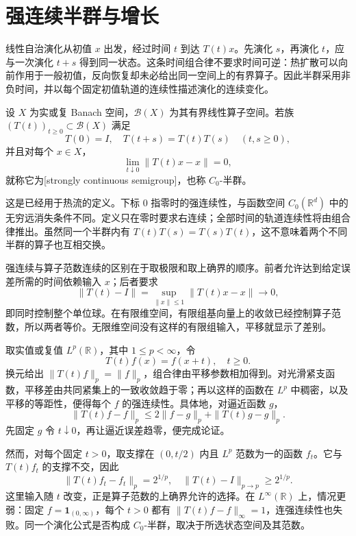 \section{强连续半群与增长}
\label{b2:sec:app-D-1}

线性自治演化从初值 \(x\) 出发，经过时间 \(t\) 到达 \(T(t)x\)。先演化 \(s\)，再演化 \(t\)，应与一次演化 \(t+s\) 得到同一状态。这条时间组合律不要求时间可逆：热扩散可以向前作用于一般初值，反向恢复却未必给出同一空间上的有界算子。因此半群采用非负时间，并以每个固定初值轨道的连续性描述演化的连续变化。

\begin{definition}\label{b2:def:D-semigroup}
设 \(X\) 为实或复 Banach 空间，\(\mathcal B(X)\) 为其有界线性算子空间。若族 \((T(t))_{t\geq0}\subset\mathcal B(X)\) 满足
\[
 T(0)=I,\quad T(t+s)=T(t)T(s)\quad(t,s\geq0),
\]
并且对每个 \(x\in X\)，
\[
 \lim_{t\downarrow0}\|T(t)x-x\|=0,
\]
就称它为[strongly continuous semigroup]，也称 \(C_0\)-半群。
\end{definition}
这是已经用于热流的定义。下标 \(0\) 指零时的强连续性，与函数空间 \(C_0(\mathbb R^d)\) 中的无穷远消失条件不同。定义只在零时要求右连续；全部时间的轨道连续性将由组合律推出。虽然同一个半群内有 \(T(t)T(s)=T(s)T(t)\)，这不意味着两个不同半群的算子也互相交换。

\ProseParagraphBreak

强连续与算子范数连续的区别在于取极限和取上确界的顺序。前者允许达到给定误差所需的时间依赖输入 \(x\)；后者要求
\[
 \|T(t)-I\|=\sup_{\|x\|\leq1}\|T(t)x-x\|\longrightarrow0,
\]
即同时控制整个单位球。在有限维空间，有限组基向量上的收敛已经控制算子范数，所以两者等价。无限维空间没有这样的有限组输入，平移就显示了差别。

\ProseParagraphBreak

取实值或复值 \(L^p(\mathbb R)\)，其中 \(1\leq p<\infty\)，令
\[
 T(t)f(x)=f(x+t),\quad t\geq0.
\]
换元给出 \(\|T(t)f\|_p=\|f\|_p\)，组合律由平移参数相加得到。对光滑紧支函数，平移差由共同紧集上的一致收敛趋于零；再以这样的函数在 \(L^p\) 中稠密，以及平移的等距性，便得每个 \(f\) 的强连续性。具体地，对逼近函数 \(g\)，
\[
 \|T(t)f-f\|_p\leq2\|f-g\|_p+\|T(t)g-g\|_p.
\]
先固定 \(g\) 令 \(t\downarrow0\)，再让逼近误差趋零，便完成论证。

\ProseParagraphBreak

然而，对每个固定 \(t>0\)，取支撑在 \((0,t/2)\) 内且 \(L^p\) 范数为一的函数 \(f_t\)。它与 \(T(t)f_t\) 的支撑不交，因此
\[
 \|T(t)f_t-f_t\|_p=2^{1/p},\quad
 \|T(t)-I\|_{p\to p}\geq2^{1/p}.
\]
这里输入随 \(t\) 改变，正是算子范数的上确界允许的选择。在 \(L^\infty(\mathbb R)\) 上，情况更弱：固定 \(f=\mathbf1_{(0,\infty)}\)，每个 \(t>0\) 都有 \(\|T(t)f-f\|_\infty=1\)，连强连续性也失败。同一个演化公式是否构成 \(C_0\)-半群，取决于所选状态空间及其范数。

